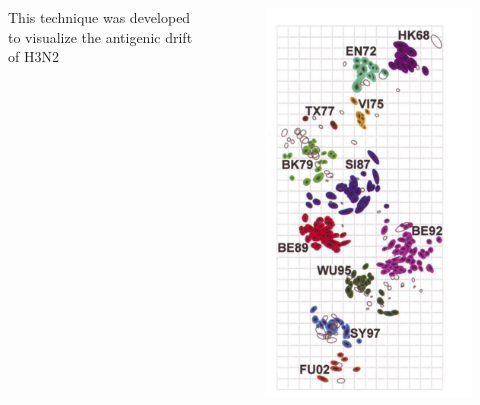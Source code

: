 \documentclass{beamer}
\begin{document}
\begin{frame}
    \begin{columns}
        \begin{column}{0.5\textwidth}
            This technique was developed to visualize the antigenic drift of H3N2 
        \end{column}
        \begin{column}{0.4\textwidth}
        \begin{figure}
        \includegraphics[width=\textwidth]{smith_antigenic.png}    
        \end{figure}   
    \end{column}
    \end{columns}
    \centering
    \vfill
    \tiny{\cite{lapedesGeometryShapeSpace2001,smithMappingAntigenicGenetic2004}}

\end{frame}
\end{document}
